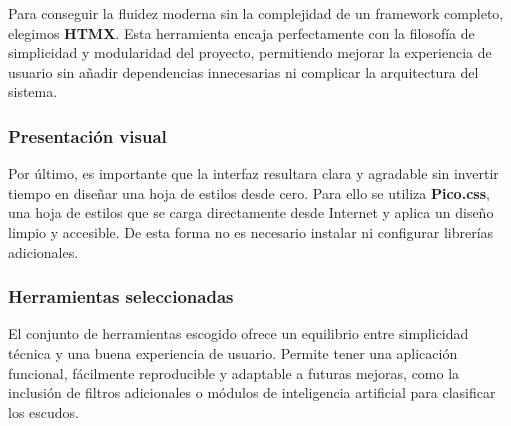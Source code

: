 Para conseguir la fluidez moderna sin la complejidad de un framework completo, elegimos \textbf{HTMX}. Esta herramienta 
encaja perfectamente con la filosofía de simplicidad y modularidad del proyecto, permitiendo mejorar la 
experiencia de usuario sin añadir dependencias innecesarias ni complicar la arquitectura del sistema.

\subsubsection{Presentación visual}
Por último, es importante que la interfaz resultara clara y agradable sin invertir tiempo 
en diseñar una hoja de estilos desde cero.  
Para ello se utiliza \textbf{Pico.css}, una hoja de estilos que se carga directamente desde Internet y aplica un diseño 
limpio y accesible. De esta forma no es necesario instalar ni configurar librerías adicionales.

\subsubsection{Herramientas seleccionadas}
El conjunto de herramientas escogido ofrece un equilibrio entre simplicidad técnica y una buena experiencia de usuario. 
Permite tener una aplicación funcional, fácilmente reproducible y adaptable a futuras mejoras, como la inclusión de 
filtros adicionales o módulos de inteligencia artificial para clasificar los escudos.